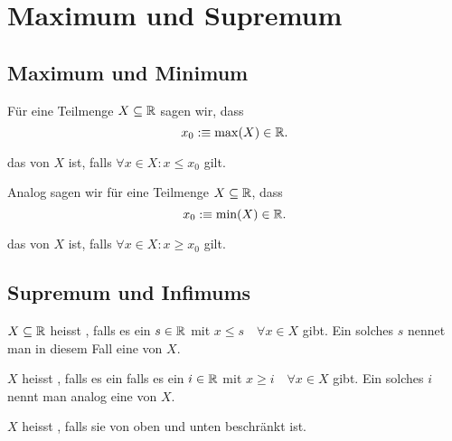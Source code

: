 \section{Maximum und Supremum}

\subsection{Maximum und Minimum}

\begin{mydef}[Maximum] Für eine Teilmenge $X \subseteq \mathbb{R}$ sagen wir, dass
  \[
    x_0 :\equiv \operatorname{max} (X) \in \mathbb{R}.
  \]

das  von $X$ ist, falls $\forall x \in X: x \leq x_0$ gilt.
\end{mydef}

\begin{mydef}[Minimum]
  Analog sagen wir für eine Teilmenge $X \subseteq \mathbb{R}$, dass
  \[
  x_0 :\equiv \operatorname{min} (X) \in \mathbb{R}.
  \]

  das  von $X$ ist, falls $\forall x \in X: x \geq x_0$ gilt.
\end{mydef}

\subsection{Supremum und Infimums}

\begin{mydef}
  $X \subseteq \mathbb{R}$ heisst , falls es ein $s\in \mathbb{R}$ mit $x \leq s \quad \forall x \in X$ gibt. Ein solches $s$ nennet man in diesem Fall eine  von $X$.

  $X$ heisst , falls es ein falls es ein $i\in \mathbb{R}$ mit $x \geq i \quad \forall x \in X$ gibt. Ein solches $i$ nennt man analog eine  von $X$.

  $X$ heisst , falls sie von oben und unten beschränkt ist.
\end{mydef}

